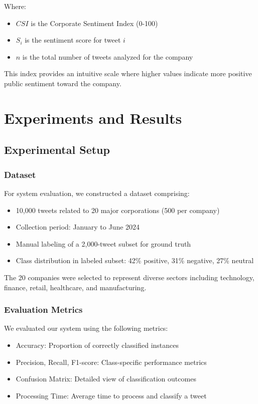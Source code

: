 \documentclass[conference]{IEEEtran}
\begin{document}
Where:
\begin{itemize}
    \item $CSI$ is the Corporate Sentiment Index (0-100)
    \item $S_i$ is the sentiment score for tweet $i$
    \item $n$ is the total number of tweets analyzed for the company
\end{itemize}

This index provides an intuitive scale where higher values indicate more positive public sentiment toward the company.
\section{Experiments and Results}

\subsection{Experimental Setup}

\subsubsection{Dataset}
For system evaluation, we constructed a dataset comprising:
\begin{itemize}
    \item 10,000 tweets related to 20 major corporations (500 per company)
    \item Collection period: January to June 2024
    \item Manual labeling of a 2,000-tweet subset for ground truth
    \item Class distribution in labeled subset: 42\% positive, 31\% negative, 27\% neutral
\end{itemize}

The 20 companies were selected to represent diverse sectors including technology, finance, retail, healthcare, and manufacturing.

\subsubsection{Evaluation Metrics}
We evaluated our system using the following metrics:
\begin{itemize}
    \item Accuracy: Proportion of correctly classified instances
    \item Precision, Recall, F1-score: Class-specific performance metrics
    \item Confusion Matrix: Detailed view of classification outcomes
    \item Processing Time: Average time to process and classify a tweet
\end{itemize}
\end{document}
